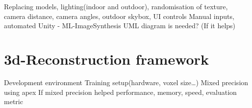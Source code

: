 Replacing models, lighting(indoor and outdoor), randomisation of texture, camera distance, camera angles, outdoor skybox,
UI controls
Manual inputs, automated
Unity - ML-ImageSynthesis
UML diagram is needed? (If it helps)

\section{3d-Reconstruction framework}\label{s:3D-Reconstruction framework}

Development environment
Training setup(hardware, voxel size…)
Mixed precision using apex
If mixed precision helped performance, memory, speed, evaluation metric


